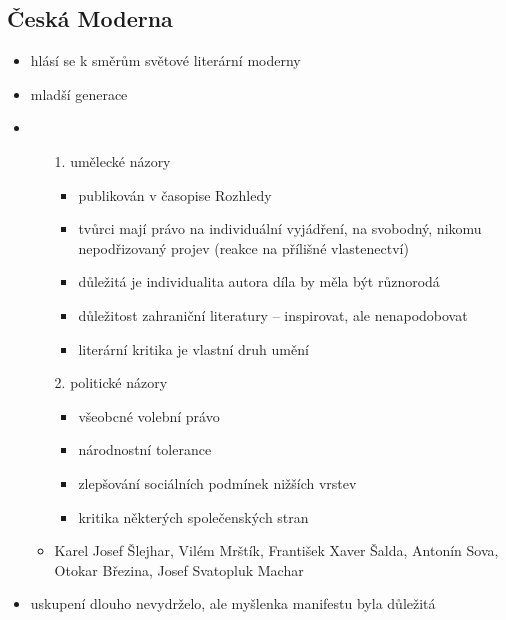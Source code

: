 \subsection{Česká Moderna}
\begin{itemize}
\item hlásí se k směrům světové literární moderny
\item mladší generace 
\item {}
	\begin{itemize}
	\item[1.] umělecké názory
		\begin{itemize}		
		\item publikován v časopise Rozhledy
		\item tvůrci mají právo na individuální vyjádření, na svobodný, nikomu nepodřizovaný projev (reakce na přílišné vlastenectví)
		\item důležitá je individualita autora \ra díla by měla být různorodá
		\item důležitost zahraniční literatury -- inspirovat, ale nenapodobovat
		\item literární kritika je vlastní druh umění
		\end{itemize}
	\item[2.] politické názory
		\begin{itemize}
		\item všeobcné volební právo
		\item národnostní tolerance
		\item zlepšování sociálních podmínek nižších vrstev
		\item kritika některých společenských stran
		\end{itemize}
	\item Karel Josef Šlejhar, Vilém Mrštík, František Xaver Šalda, Antonín Sova, Otokar Březina, Josef Svatopluk Machar
\end{itemize}
\item uskupení dlouho nevydrželo, ale myšlenka manifestu byla důležitá
\end{itemize}

